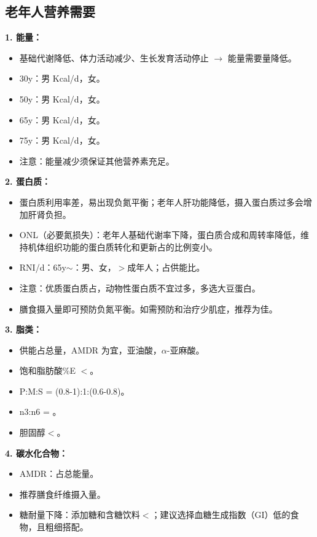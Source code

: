 \subsection{老年人营养需要}

\begin{keybox}
\textbf{1. 能量：}
\begin{itemize}[leftmargin=*]
    \item 基础代谢降低、体力活动减少、生长发育活动停止 $\rightarrow$ 能量需要量降低。
    \item 30y：男 Kcal/d，女。
    \item 50y：男 Kcal/d，女。
    \item 65y：男 Kcal/d，女。
    \item 75y：男 Kcal/d，女。
    \item 注意：能量减少须保证其他营养素充足。
\end{itemize}

\textbf{2. 蛋白质：}
\begin{itemize}[leftmargin=*]
    \item 蛋白质利用率差，易出现负氮平衡；老年人肝功能降低，摄入蛋白质过多会增加肝肾负担。
    \item ONL（必要氮损失）：老年人基础代谢率下降，蛋白质合成和周转率降低，维持机体组织功能的蛋白质转化和更新占的比例变小。
    \item RNI/d：65y$\sim$：男、女，$>$成年人；占供能比。
    \item 注意：优质蛋白质占，动物性蛋白质不宜过多，多选大豆蛋白。
    \item 膳食摄入量即可预防负氮平衡。如需预防和治疗少肌症，推荐为佳。
\end{itemize}

\textbf{3. 脂类：}
\begin{itemize}[leftmargin=*]
    \item 供能占总量，AMDR 为宜，亚油酸，$\alpha$-亚麻酸。
    \item 饱和脂肪酸\%E $<$。
    \item P:M:S = (0.8-1):1:(0.6-0.8)。
    \item n3:n6 = 。
    \item 胆固醇$<$。
\end{itemize}

\textbf{4. 碳水化合物：}
\begin{itemize}[leftmargin=*]
    \item AMDR：占总能量。
    \item 推荐膳食纤维摄入量。
    \item 糖耐量下降：添加糖和含糖饮料$<$；建议选择血糖生成指数（GI）低的食物，且粗细搭配。
\end{itemize}


\end{keybox}
